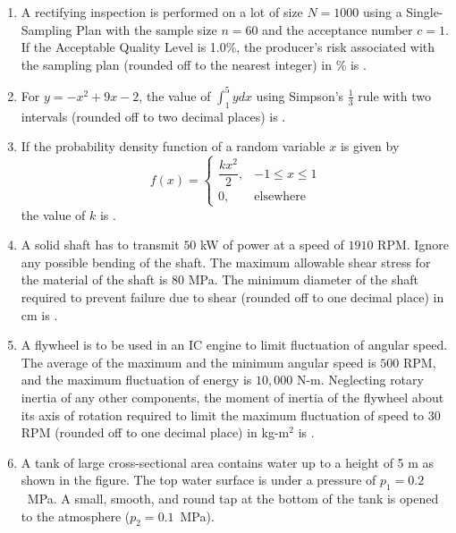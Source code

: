 \documentclass[journal,12pt,onecolumn]{IEEEtran}
\theoremstyle{remark}
\begin{document}
\begin{enumerate}
\item A rectifying inspection is performed on a lot of size $N=1000$ using a Single-Sampling Plan with the sample size $n=60$ and the acceptance number $c=1$. If the Acceptable Quality Level is 1.0\%, the producer's risk associated with the sampling plan (rounded off to the nearest integer) in \% is \underline{\hspace{2cm}}.
\vspace{1cm}

\item For $y = -x^2 + 9x - 2$, the value of $\int_1^5 y dx$ using Simpson's $\frac{1}{3}$ rule with two intervals (rounded off to two decimal places) is \underline{\hspace{2cm}}.
\vspace{1cm}

\item If the probability density function of a random variable $x$ is given by
\[
f(x) = 
\begin{cases}
\dfrac{k x^2}{2}, & -1 \leq x \leq 1 \\
0, & \text{elsewhere}
\end{cases}
\]
the value of $k$ is \underline{\hspace{2cm}}.
\vspace{1cm}

\item A solid shaft has to transmit $50$ kW of power at a speed of $1910$ RPM. Ignore any possible bending of the shaft. The maximum allowable shear stress for the material of the shaft is $80$ MPa. The minimum diameter of the shaft required to prevent failure due to shear (rounded off to one decimal place) in cm is \underline{\hspace{2cm}}.
\vspace{1cm}

\item A flywheel is to be used in an IC engine to limit fluctuation of angular speed. The average of the maximum and the minimum angular speed is $500$ RPM, and the maximum fluctuation of energy is $10,000$ N-m. Neglecting rotary inertia of any other components, the moment of inertia of the flywheel about its axis of rotation required to limit the maximum fluctuation of speed to 30 RPM (rounded off to one decimal place) in kg-m$^2$ is \underline{\hspace{2cm}}.
\vspace{1cm}
\newpage
\item A tank of large cross-sectional area contains water up to a height of 5 m as shown in the figure.
The top water surface is under a pressure of $p_1 = 0.2$~MPa. A small, smooth, and round tap at the bottom of the tank is opened to the atmosphere ($p_2 = 0.1$~MPa).


\end{enumerate}
\end{document}
